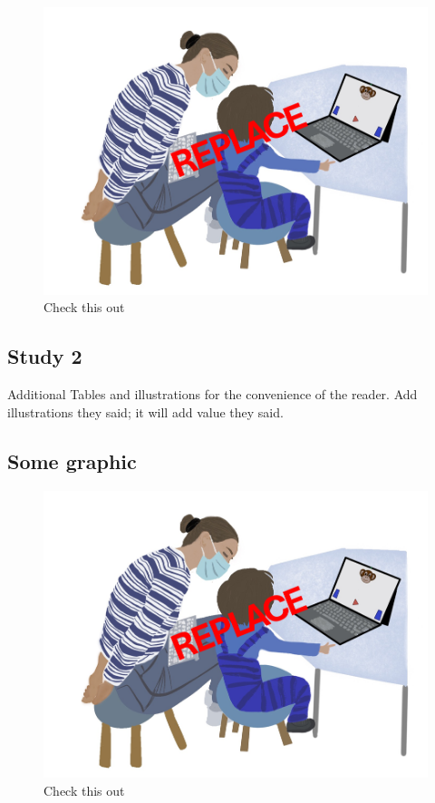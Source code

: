 \documentclass[
  man]{apa6}
\begin{document}
\begin{figure}

{\centering \includegraphics{../illustrations/Symlit_Rep_Setup} 

}

\caption{Check this out}\label{fig:suppl-setup3}
\end{figure}

\subsection{Study 2}\label{study-2-1}

Additional Tables and illustrations for the convenience of the reader. Add illustrations they said; it will add value they said.

\subsection{Some graphic}\label{some-graphic-1}

\begin{figure}

{\centering \includegraphics{../illustrations/Symlit_Rep_Setup} 

}

\caption{Check this out}\label{fig:suppl-setup4}
\end{figure}
\end{document}
